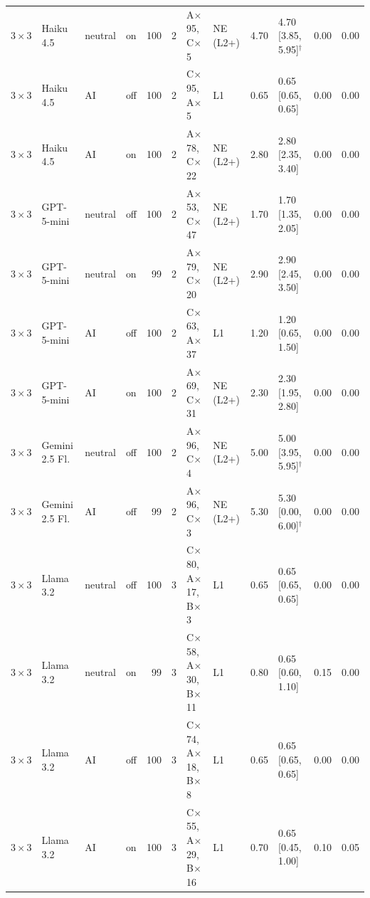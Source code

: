 \documentclass[11pt]{article}
\begin{document}
\begin{longtable}{@{}llllrrp{2.3cm}lrlrr@{}}
$3{\times}3$ & Haiku 4.5 & neutral & on & 100 & 2 & A$\times$95, C$\times$5 & NE (L2+) & 4.70 & 4.70 [3.85, 5.95]$^\dagger$ & 0.00 & 0.00 \\
$3{\times}3$ & Haiku 4.5 & AI & off & 100 & 2 & C$\times$95, A$\times$5 & L1 & 0.65 & 0.65 [0.65, 0.65] & 0.00 & 0.00 \\
$3{\times}3$ & Haiku 4.5 & AI & on & 100 & 2 & A$\times$78, C$\times$22 & NE (L2+) & 2.80 & 2.80 [2.35, 3.40] & 0.00 & 0.00 \\
$3{\times}3$ & GPT-5-mini & neutral & off & 100 & 2 & A$\times$53, C$\times$47 & NE (L2+) & 1.70 & 1.70 [1.35, 2.05] & 0.00 & 0.00 \\
$3{\times}3$ & GPT-5-mini & neutral & on & 99 & 2 & A$\times$79, C$\times$20 & NE (L2+) & 2.90 & 2.90 [2.45, 3.50] & 0.00 & 0.00 \\
$3{\times}3$ & GPT-5-mini & AI & off & 100 & 2 & C$\times$63, A$\times$37 & L1 & 1.20 & 1.20 [0.65, 1.50] & 0.00 & 0.00 \\
$3{\times}3$ & GPT-5-mini & AI & on & 100 & 2 & A$\times$69, C$\times$31 & NE (L2+) & 2.30 & 2.30 [1.95, 2.80] & 0.00 & 0.00 \\
$3{\times}3$ & Gemini 2.5 Fl. & neutral & off & 100 & 2 & A$\times$96, C$\times$4 & NE (L2+) & 5.00 & 5.00 [3.95, 5.95]$^\dagger$ & 0.00 & 0.00 \\
$3{\times}3$ & Gemini 2.5 Fl. & AI & off & 99 & 2 & A$\times$96, C$\times$3 & NE (L2+) & 5.30 & 5.30 [0.00, 6.00]$^\dagger$ & 0.00 & 0.00 \\
$3{\times}3$ & Llama 3.2 & neutral & off & 100 & 3 & C$\times$80, A$\times$17, B$\times$3 & L1 & 0.65 & 0.65 [0.65, 0.65] & 0.00 & 0.00 \\
$3{\times}3$ & Llama 3.2 & neutral & on & 99 & 3 & C$\times$58, A$\times$30, B$\times$11 & L1 & 0.80 & 0.65 [0.60, 1.10] & 0.15 & 0.00 \\
$3{\times}3$ & Llama 3.2 & AI & off & 100 & 3 & C$\times$74, A$\times$18, B$\times$8 & L1 & 0.65 & 0.65 [0.65, 0.65] & 0.00 & 0.00 \\
$3{\times}3$ & Llama 3.2 & AI & on & 100 & 3 & C$\times$55, A$\times$29, B$\times$16 & L1 & 0.70 & 0.65 [0.45, 1.00] & 0.10 & 0.05 \\
\bottomrule
\end{longtable}
\normalsize
\end{document}
